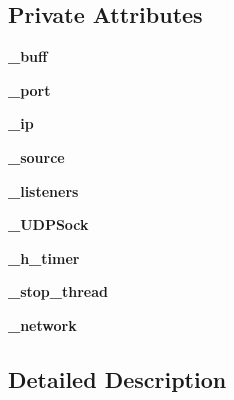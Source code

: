 \subsection*{Private Attributes}
\begin{CompactItemize}
\item 
\hypertarget{classxPLAPI_1_1Manager_3ed8de348b50c251796cdca17dbd2aa3}{
\textbf{\_\-buff}}
\label{classxPLAPI_1_1Manager_3ed8de348b50c251796cdca17dbd2aa3}

\item 
\hypertarget{classxPLAPI_1_1Manager_2bc7b3100a53ad071f76f3b681c52661}{
\textbf{\_\-port}}
\label{classxPLAPI_1_1Manager_2bc7b3100a53ad071f76f3b681c52661}

\item 
\hypertarget{classxPLAPI_1_1Manager_c683222401e40e3d2fd218263a1450c0}{
\textbf{\_\-ip}}
\label{classxPLAPI_1_1Manager_c683222401e40e3d2fd218263a1450c0}

\item 
\hypertarget{classxPLAPI_1_1Manager_704810400121d4f606126b0a639e22c6}{
\textbf{\_\-source}}
\label{classxPLAPI_1_1Manager_704810400121d4f606126b0a639e22c6}

\item 
\hypertarget{classxPLAPI_1_1Manager_86ca9159e4cb44b28540f7afc82743e2}{
\textbf{\_\-listeners}}
\label{classxPLAPI_1_1Manager_86ca9159e4cb44b28540f7afc82743e2}

\item 
\hypertarget{classxPLAPI_1_1Manager_4c26907af60a5c4cb2e88b68a51273b7}{
\textbf{\_\-UDPSock}}
\label{classxPLAPI_1_1Manager_4c26907af60a5c4cb2e88b68a51273b7}

\item 
\hypertarget{classxPLAPI_1_1Manager_290fb2f20ababa2c8a5d5f897372b815}{
\textbf{\_\-h\_\-timer}}
\label{classxPLAPI_1_1Manager_290fb2f20ababa2c8a5d5f897372b815}

\item 
\hypertarget{classxPLAPI_1_1Manager_d6ccff08bbaa94d7ce89ce1bd847708c}{
\textbf{\_\-stop\_\-thread}}
\label{classxPLAPI_1_1Manager_d6ccff08bbaa94d7ce89ce1bd847708c}

\item 
\hypertarget{classxPLAPI_1_1Manager_b1941f7867b7a151b21fd865f7ac9f82}{
\textbf{\_\-network}}
\label{classxPLAPI_1_1Manager_b1941f7867b7a151b21fd865f7ac9f82}

\end{CompactItemize}


\subsection{Detailed Description}



